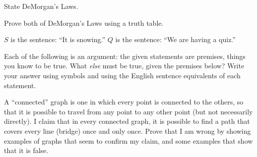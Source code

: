 \documentclass[addpoints, 12pt]{exam}
\begin{document}
\begin{questions}


\question State DeMorgan's Laws.

\question Prove both of DeMorgan's Laws using a truth table.

\question $S$ is the sentence: ``It is snowing.''  $Q$ is the sentence: ``We are having a quiz.''

\question Each of the following is an argument: the given statements are premises, things you know to be true.  What \emph{else} must be true, given the premises below?  Write your answer using symbols and using the English sentence equivalents of each statement.




\question  A ``connected'' graph is one in which every point is connected to the others, so that it is possible to travel from any point to any other point (but not necessarily directly).  I claim that in every connected graph, it is possible to find a path that covers every line (bridge) once and only once.  Prove  that I am wrong by showing examples of graphs that seem to confirm my claim, and some examples that show that it is false. 


\end{questions}
\end{document}
